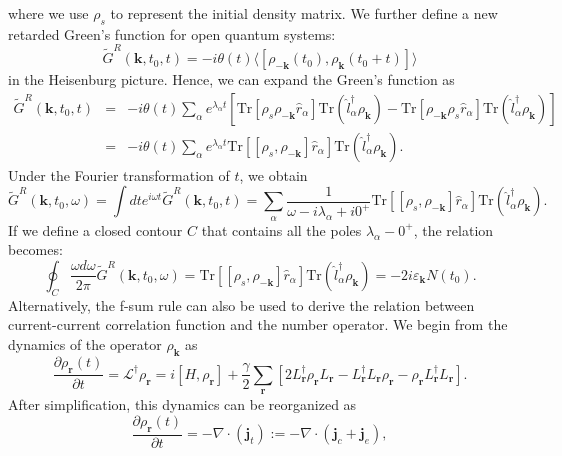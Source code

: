 \documentclass[aps,superscriptaddress,notitlepage,longbibliography]{revtex4-1}
\begin{document}
where we use $\rho_{s}$ to represent the initial density matrix.
We further define a new retarded Green's function for open quantum
systems: 
\begin{equation}
\tilde{G}^{R}(\bm{k},t_{0},t)=-i\theta(t)\langle[\rho_{-\bm{k}}(t_{0}),\rho_{\bm{k}}(t_{0}+t)]\rangle
\end{equation}
in the Heisenburg picture. Hence, we can expand the Green's function
as 
\begin{eqnarray}
\tilde{G}^{R}(\bm{k},t_{0},t) & = & -i\theta(t)\sum_{\alpha}e^{\lambda_{\alpha}t}[\text{Tr}[\rho_{s}\rho_{-\bm{k}}\hat{r}_{\alpha}]\text{Tr}(\hat{l}_{\alpha}^{\dagger}\rho_{\bm{k}})-\text{Tr}[\rho_{-\bm{k}}\rho_{s}\hat{r}_{\alpha}]\text{Tr}(\hat{l}_{\alpha}^{\dagger}\rho_{\bm{k}})]\nonumber \\
 & = & -i\theta(t)\sum_{\alpha}e^{\lambda_{\alpha}t}\text{Tr}[[\rho_{s},\rho_{-\bm{k}}]\hat{r}_{\alpha}]\text{Tr}(\hat{l}_{\alpha}^{\dagger}\rho_{\bm{k}}).
\end{eqnarray}
Under the Fourier transformation of $t$, we obtain 
\begin{equation}
\tilde{G}^{R}(\bm{k},t_{0},\omega)=\int dte^{i\omega t}\tilde{G}^{R}(\bm{k},t_{0},t)=\sum_{\alpha}\frac{1}{\omega-i\lambda_{\alpha}+i0^{+}}\text{Tr}[[\rho_{s},\rho_{-\bm{k}}]\hat{r}_{\alpha}]\text{Tr}(\hat{l}_{\alpha}^{\dagger}\rho_{\bm{k}}).
\end{equation}
If we define a closed contour $C$ that contains all the poles $\lambda_{\alpha}-0^{+}$,
the relation becomes: 
\begin{equation}
\oint_{C}\frac{\omega d\omega}{2\pi}\tilde{G}^{R}(\bm{k},t_{0},\omega)=\text{Tr}[[\rho_{s},\rho_{-\bm{k}}]\hat{r}_{\alpha}]\text{Tr}(\hat{l}_{\alpha}^{\dagger}\rho_{\bm{k}})=-2i\varepsilon_{\bm{k}}N(t_{0}).\label{eq:f}
\end{equation}
Alternatively, the f-sum rule can also be used to derive the relation
between current-current correlation function and the number operator.
We begin from the dynamics of the operator $\rho_{\bm{k}}$ as 
\begin{equation}
\frac{\partial\rho_{\bm{r}}(t)}{\partial t}=\mathcal{L}^{\dagger}\rho_{\bm{r}}=i[H,\rho_{\bm{r}}]+\frac{\gamma}{2}\sum_{\bm{r}}[2L_{\bm{r}}^{\dagger}\rho_{\bm{r}}L_{\bm{r}}-L_{\bm{r}}^{\dagger}L_{\bm{r}}\rho_{\bm{r}}-\rho_{\bm{r}}L_{\bm{r}}^{\dagger}L_{\bm{r}}].\label{eq:continuous}
\end{equation}
After simplification, this dynamics can be reorganized as 
\begin{equation}
\frac{\partial\rho_{\bm{r}}(t)}{\partial t}=-\nabla\cdot(\bm{j}_{t}):=-\nabla\cdot(\bm{j}_{c}+\bm{j}_{e}),
\end{equation}
\end{document}
